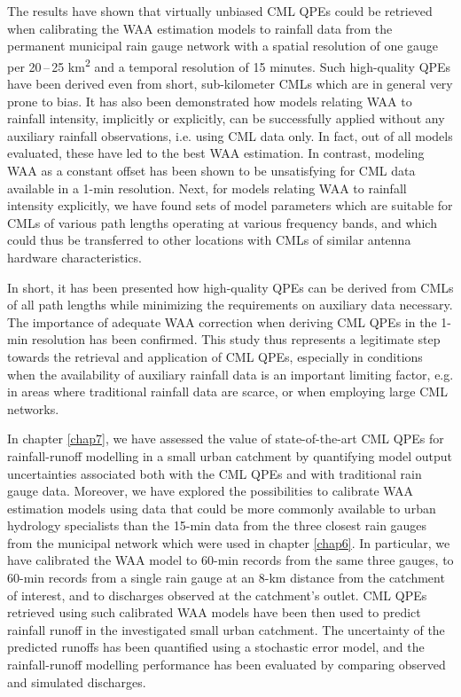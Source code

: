 \documentclass{ctuthesis}\usepackage[]{graphicx}\usepackage[]{color}
\begin{document}
The results have shown that virtually unbiased CML QPEs could be retrieved when calibrating the WAA estimation models to rainfall data from the permanent municipal rain gauge network with a spatial resolution of one gauge per 20\,--\,25 km\textsuperscript{2} and a temporal resolution of 15 minutes. Such high-quality QPEs have been derived even from short, sub-kilometer CMLs which are in general very prone to bias. It has also been demonstrated how models relating WAA to rainfall intensity, implicitly or explicitly, can be successfully applied without any auxiliary rainfall observations, i.e. using CML data only. In fact, out of all models evaluated, these have led to the best WAA estimation. In contrast, modeling WAA as a constant offset has been shown to be unsatisfying for CML data available in a 1-min resolution. Next, for models relating WAA to rainfall intensity explicitly, we have found sets of model parameters which are suitable for CMLs of various path lengths operating at various frequency bands, and which could thus be transferred to other locations with CMLs of similar antenna hardware characteristics.  

In short, it has been presented how high-quality QPEs can be derived from CMLs of all path lengths while minimizing the requirements on auxiliary data necessary. The importance of adequate WAA correction when deriving CML QPEs in the 1-min resolution has been confirmed. This study thus represents a legitimate step towards the retrieval and application of CML QPEs, especially in conditions when the availability of auxiliary rainfall data is an important limiting factor, e.g. in areas where traditional rainfall data are scarce, or when employing large CML networks.


In chapter \ref{chap7}, we have assessed the value of state-of-the-art CML QPEs for rainfall-runoff modelling in a small urban catchment by quantifying model output uncertainties associated both with the CML QPEs and with traditional rain gauge data. Moreover, we have explored the possibilities to calibrate WAA estimation models using data that could be more commonly available to urban hydrology specialists than the 15-min data from the three closest rain gauges from the municipal network which were used in chapter \ref{chap6}. In particular, we have calibrated the WAA model to 60-min records from the same three gauges, to 60-min records from a single rain gauge at an 8-km distance from the catchment of interest, and to discharges observed at the catchment's outlet. CML QPEs retrieved using such calibrated WAA models have been then used to predict rainfall runoff in the investigated small urban catchment. The uncertainty of the predicted runoffs has been quantified using a stochastic error model, and the rainfall-runoff modelling performance has been evaluated by comparing observed and simulated discharges.
\end{document}
